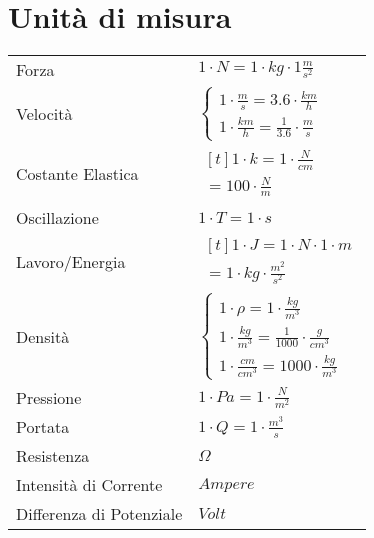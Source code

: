 \section{Unità di misura}
\begin{center}
  \begin{tabularx}{\textwidth}{ l l }
      Forza & $1 \cdot N = 1 \cdot kg \cdot 1 \frac{m}{s^2}$ \\
      Velocità & $\begin{cases}
        1 \cdot \frac{m}{s} = 3.6 \cdot \frac{km}{h} \\
        1 \cdot \frac{km}{h} = \frac{1}{3.6} \cdot \frac{m}{s}
      \end{cases}$ \\
      Costante Elastica & $\!\begin{aligned}[t]1 \cdot k = 1 \cdot \frac{N}{cm} \\ = 100 \cdot \frac{N}{m}\end{aligned}$ \\
      Oscillazione & $1 \cdot T = 1 \cdot s$ \\
      Lavoro/Energia & $\!\begin{aligned}[t]1 \cdot J = 1 \cdot N \cdot 1 \cdot m \\ = 1 \cdot kg \cdot \frac{m^2}{s^2} \end{aligned}$ \\
      Densità & $\begin{cases}
        1 \cdot \rho = 1 \cdot \frac{kg}{m^3} \\
        1 \cdot \frac{kg}{m^3} = \frac{1}{1000} \cdot \frac{g}{cm^3} \\
        1 \cdot \frac{cm}{cm^3} = 1000 \cdot \frac{kg}{m^3}
      \end{cases}$ \\
      Pressione & $1 \cdot Pa = 1 \cdot \frac{N}{m^2}$ \\
      Portata & $1 \cdot Q = 1 \cdot \frac{m^3}{s}$ \\
      Resistenza & $\Omega$ \\
      Intensità di Corrente & $Ampere$ \\
      Differenza di Potenziale & $Volt$
  \end{tabularx}
\end{center}